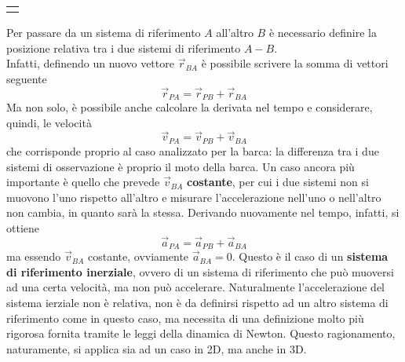 \documentclass[a4paper]{extarticle}
\begin{document}
\vspace{2em}
\noindent
{}
\begin{tabularx}{\textwidth}{P}
  {
      \centering
  }
\end{tabularx}

\vspace{1em}
\noindent
Per passare da un sistema di riferimento $A$ all'altro $B$ è necessario definire la posizione relativa tra i due sistemi di riferimento $A-B$.\\
Infatti, definendo un nuovo vettore $\vec{r}_{BA}$ è possibile scrivere la somma di vettori seguente
\[\vec{r}_{PA} = \vec{r}_{PB} + \vec{r}_{BA}\]
Ma non solo, è possibile anche calcolare la derivata nel tempo e considerare, quindi, le velocità
\[\vec{v}_{PA} = \vec{v}_{PB} + \vec{v}_{BA}\]
che corrisponde proprio al caso analizzato per la barca: la differenza tra i due sistemi di osservazione è proprio il moto della barca. Un caso ancora più importante è quello che prevede $\vec{v}_{BA}$ \textbf{costante}, per cui i due sistemi non si muovono l'uno rispetto all'altro e misurare l'accelerazione nell'uno o nell'altro non cambia, in quanto sarà la stessa. Derivando nuovamente nel tempo, infatti, si ottiene
\[\vec{a}_{PA} = \vec{a}_{PB} + \vec{a}_{BA}\]
ma essendo $\vec{v}_{BA}$ costante, ovviamente $\vec{a}_{BA} = 0$. Questo è il caso di un \textbf{sistema di riferimento inerziale}, ovvero di un sistema di riferimento che può muoversi ad una certa velocità, ma non può accelerare. Naturalmente l'accelerazione del sistema ierziale non è relativa, non è da definirsi rispetto ad un altro sistema di riferimento come in questo caso, ma necessita di una definizione molto più rigorosa fornita tramite le leggi della dinamica di Newton. Questo ragionamento, naturamente, si applica sia ad un caso in 2D, ma anche in 3D.
\end{document}

